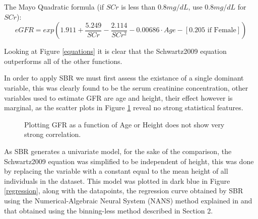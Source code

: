 \documentclass[10pt,final]{siamltex}
\begin{document}
The Mayo Quadratic formula \cite{mayo} (if $SCr$ is less than $0.8 mg/dL$, use $0.8 mg/dL$ for $SCr$):
$$eGFR = exp(1.911+\frac{5.249}{SCr}-\frac{2.114}{SCr^2}-0.00686\cdot Age - [0.205 \text{ if Female}])$$

Looking at Figure \ref{equations} it is clear that the Schwartz2009 equation outperforms all of the other functions.

In order to apply SBR we must first assess the existance of a single dominant variable, this was clearly found to be the serum creatinine concentration, other variables used to estimate GFR are age and height, their effect however is marginal, as the scatter plots in Figure \ref{recessive} reveal no strong statistical features.

\begin{figure}[ht]
  \centering
  \caption{Plotting GFR as a function of Age or Height does not show very strong correlation.}
  \label{recessive}
\end{figure}

As SBR generates a univariate model, for the sake of the comparison, the Schwartz2009 equation was simplified to be independent of height, this was done by replacing the variable with a constant equal to the mean height of all individuals in the dataset. This model was plotted in dark blue in Figure \ref{regression}, along with the datapoints, the regression curve obtained by SBR using the Numerical-Algebraic Neural System (NANS) method explained in \cite{fiori} and that obtained using the binning-less method described in Section 2.
\end{document}
